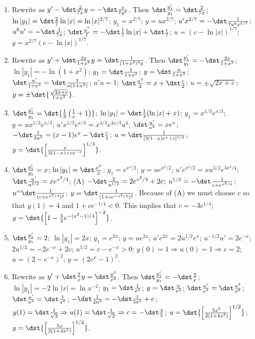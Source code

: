 \documentclass[openany]{book}
\newenvironment{sectionSolutions}{
 \begin{enumerate}[item-label={\thesection.\arabic{enumi}.}]
}{
 \end{enumerate}
}
\begin{document}
\begin{sectionSolutions}
\item
 Rewrite as $y'-\dst\frac{2}{7x}y=-\dst\frac{x}{7y^6}$. Then
$\dst\frac{y_1'}{ y_1}=\dst\frac{2}{7x}$;\;
$\ln|y_1|=\dst\frac{2}{7}\ln|x|=\ln|x|^{2/7}$;\;
$y_1=x^{2/7}$;\;
$y=ux^{2/7}$;\;
$u'x^{2/7}=-\dst\frac{1}{7u^6x^{5/7}}$;\;
$u^6u'=-\dst\frac{1}{7x}$;\;
$\dst\frac{u^7}{7}=-\dst\frac{1}{7}\ln|x|+\dst\frac{c}{7}$;\;
$u=(c-\ln|x|)^{1/7}$;\;
$y=x^{2/7}(c-\ln|x|)^{1/7}$.


\item
 Rewrite as $y'+\dst\frac{2x}{1+x^2}y=\dst\frac{1}{(1+x^2)^2y}$.
Then
$\dst\frac{y_1'}{ y_1}=-\dst\frac{2x}{1+x^2}$;\;
$\ln|y_1|=-\ln(1+x^2)$;\;
$y_1=\dst\frac{1}{1+x^2}$;\;
$y=\dst\frac{u}{1+x^2}$;\;
$\dst\frac{u'}{1+x^2}=\dst\frac{1}{ u(1+x^2)}$;\;
$u'u=1$;\;
$\dst\frac{u^2}{2}=x+\dst\frac{c}{2}$;\;
$u=\pm\sqrt{2x+c}$;\;
$y=\pm\dst{\frac{\sqrt{2x+c}}{1+x^2}}$.


\item
$\dst\frac{y_1'}{ y_1}=\dst{\frac{1}{3}\left(\frac{1}{ x}+1\right)}$;\;
$\ln|y_1|=\dst\frac{1}{3}(\ln|x|+x)$;\;
$y_1=x^{1/3}e^{x/3}$;\;
$y=ux^{1/3}e^{x/3}$;\;
$u'x^{1/3}e^{x/3}=x^{4/3}e^{4x/3}u^4$;\;
$\dst\frac{u'}{ u^4}=xe^x$;\;
$-\dst\frac{1}{3u^3}=(x-1)e^x-\dst\frac{c}{3}$;\;
$u=\dst\frac{1}{[3(1-x)e^x+c]^{1/3}}$;\;
$y=\dst{\left[\frac{x}{3(1-x)+ce^{-x}}\right]^{1/3}}$.


\item
$\dst\frac{y_1'}{ y_1}=x$;\;
$\ln|y_1|=\dst\frac{x^2}{2}$;\;
$y_1=e^{x^2/2}$;\;
$y=ue^{x^2/2}$;\;
$u'e^{x^2/2}=xu^{3/2}e^{3x^2/4}$;\;
$\dst\frac{u'}{ u^{3/2}}=xe^{x^2/4}$;\;
(A) $-\dst\frac{2}{ u^{1/2}}=2e^{x^2/4}+2c$;\;
$u^{1/2}=-\dst\frac{1}{ c+e^{x^2/4}}$;\;
$u^=\dst\frac{1}{(c+e^{x^2/4})^2}$;\;
$y=\dst\frac{1}{(1+ce^{-x^2/4})^2}$. Because of (A) we must choose $c$
so that $y(1)=4$ and $1+ce^{-1/4}<0$. This implies that
$c=-3e^{1/4}$;\;
$y=\dst{\left[1-\frac{3}{2}e^{-(x^2-1)/4}\right]^{-2}}$.


\item
$\dst\frac{y_1'}{ y_1}=2$;\;
$\ln|y_1|=2x$;\;
$y_1=e^{2x}$;\;
$y=ue^{2x}$;\;
$u'e^{2x}=2u^{1/2}e^x$;\;
$u^{-1/2}u'=2e^{-x}$;\;
$2u^{1/2}=-2e^{-x}+2c$;\;
$u^{1/2}=c-e^{-x}>0$;\;
$y(0)=1\Rightarrow u(0)=1\Rightarrow
c=2$;\;
$u=(2-e^{-x})^2$;\;
$y=(2e^x-1)^2$.


\item
Rewrite as $y'+\dst\frac{2}{ x}y=\dst\frac{y^3}{ x^2}$. Then
$\dst\frac{y_1'}{ y_1}=-\dst\frac{2}{ x}$;\;
$\ln|y_1|=-2\ln|x|=\ln x^{-2}$;\;
$y_1=\dst\frac{1}{ x^2}$;\;
$y=\dst\frac{u}{ x^2}$;\;
$\dst\frac{u'}{ x^2}=\dst\frac{u^3}{ x^8}$;\;
$\dst\frac{u'}{ u^3}=\dst\frac{1}{ x^6}$;\;
$-\dst\frac{1}{2u^2}=-\dst\frac{1}{5x^5}+c$;\;
$y(1)=\dst\frac{1}{\sqrt2}\Rightarrow u(1)=\dst\frac{1}{\sqrt2}\Rightarrow
c=-\dst\frac{4}{5}$;\;
$u=\dst{\left[\frac{5x^5}{2(1+4x^5)}\right]^{1/2}}$;\;
$y=\dst{\left[\frac{5x}{2(1+4x^5)}\right]^{1/2}}$.



\end{sectionSolutions}
\end{document}
